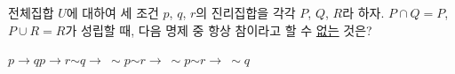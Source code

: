 전체집합 $U$에 대하여 세 조건 $p$, $q$, $r$의 진리집합을 각각 $P$, $Q$, $R$라 하자. $P\cap Q=P$, $P\cup R=R$가 성립할 때, 다음 명제 중 항상 참이라고 할 수 \underline{없는} 것은?
\begin{choices32}{$p\longrightarrow q$}{$p\longrightarrow r$}{$\sim q\longrightarrow\ \sim p$}{$\sim r\longrightarrow\ \sim p$}{$\sim r\longrightarrow\ \sim q$}\end{choices32}
